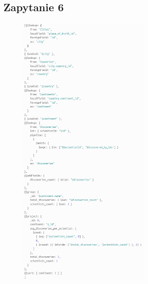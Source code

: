\documentclass[11pt]{article}
\begin{document}
\newpage
	\subsection{Zapytanie 6}
		\begin{figure}[!ht]
			\begin{center}
				\includegraphics[width=250px]{m6.png}
			\end{center}
		\end{figure}
	
\newpage	
\end{document}
